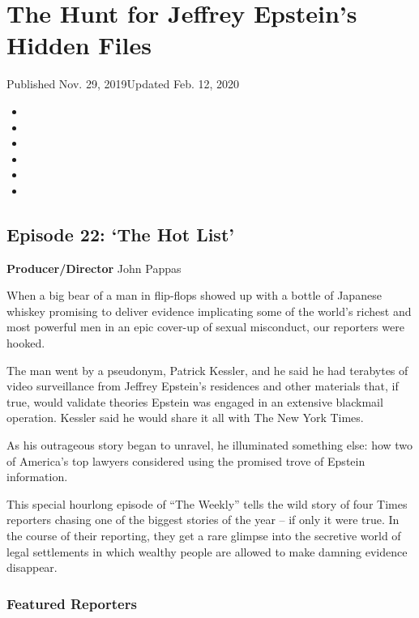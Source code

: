\hypertarget{the-hunt-for-jeffrey-epsteins-hidden-files-1}{%
\section{The Hunt for Jeffrey Epstein's Hidden
Files}\label{the-hunt-for-jeffrey-epsteins-hidden-files-1}}

Published Nov. 29, 2019Updated Feb. 12, 2020

\begin{itemize}
\item
\item
\item
\item
\item
\item
\end{itemize}

\hypertarget{episode-22-the-hot-list}{%
\subsection{Episode 22: `The Hot List'}\label{episode-22-the-hot-list}}

\textbf{Producer/Director} John Pappas

When a big bear of a man in flip-flops showed up with a bottle of
Japanese whiskey promising to deliver evidence implicating some of the
world's richest and most powerful men in an epic cover-up of sexual
misconduct, our reporters were hooked.

The man went by a pseudonym, Patrick Kessler, and he said he had
terabytes of video surveillance from Jeffrey Epstein's residences and
other materials that, if true, would validate theories Epstein was
engaged in an extensive blackmail operation. Kessler said he would share
it all with The New York Times.

As his outrageous story began to unravel, he illuminated something else:
how two of America's top lawyers considered using the promised trove of
Epstein information.

This special hourlong episode of ``The Weekly'' tells the wild story of
four Times reporters chasing one of the biggest stories of the year --
if only it were true. In the course of their reporting, they get a rare
glimpse into the secretive world of legal settlements in which wealthy
people are allowed to make damning evidence disappear.

\hypertarget{featured-reporters}{%
\subsubsection{\texorpdfstring{\textbf{Featured
Reporters}}{Featured Reporters}}\label{featured-reporters}}

